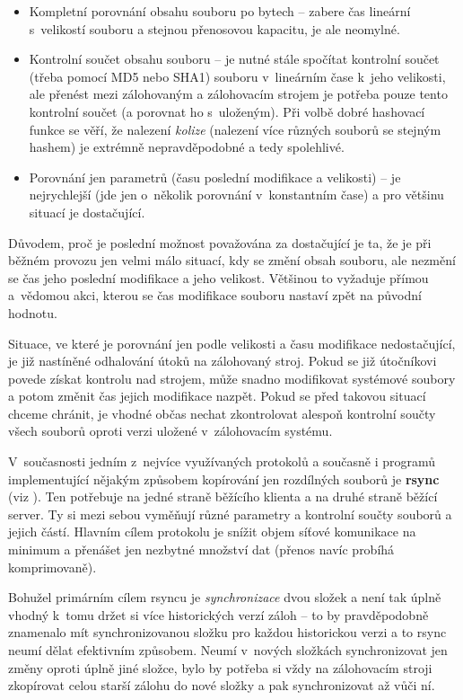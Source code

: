 \begin{itemize}
	\item Kompletní porovnání obsahu souboru po bytech -- zabere čas lineární
	s~velikostí souboru a stejnou přenosovou kapacitu, je ale neomylné.
	\item Kontrolní součet obsahu souboru -- je nutné stále spočítat kontrolní
	součet (třeba pomocí \gls{MD5} nebo \gls{SHA1}) souboru v~lineárním čase
	k~jeho velikosti, ale přenést mezi zálohovaným a zálohovacím strojem je
	potřeba pouze tento kontrolní součet (a porovnat ho s~uloženým). Při volbě
	dobré hashovací funkce se věří, že nalezení {\it kolize} (nalezení více
	různých souborů se stejným hashem) je extrémně nepravděpodobné a tedy
	spolehlivé.
	\item Porovnání jen parametrů (času poslední modifikace a velikosti) --
	je nejrychlejší (jde jen o~několik porovnání v~konstantním čase) a pro
	většinu situací je dostačující.
\end{itemize}

Důvodem, proč je poslední možnost považována za dostačující je ta, že je při
běžném provozu jen velmi málo situací, kdy se změní obsah souboru, ale nezmění
se čas jeho poslední modifikace a jeho velikost. Většinou to vyžaduje přímou
a~vědomou akci, kterou se čas modifikace souboru nastaví zpět na původní
hodnotu.

Situace, ve které je porovnání jen podle velikosti a času modifikace
nedostačující, je již nastíněné odhalování útoků na zálohovaný stroj. Pokud se
již útočníkovi povede získat kontrolu nad strojem, může snadno modifikovat
systémové soubory a potom změnit čas jejich modifikace nazpět. Pokud se před
takovou situací chceme chránit, je vhodné občas nechat zkontrolovat alespoň
kontrolní součty všech souborů oproti verzi uložené v~zálohovacím systému.

V~současnosti jedním z~nejvíce využívaných protokolů a současně i programů
implementující nějakým způsobem kopírování jen rozdílných souborů je {\bf rsync}
(viz \cite{rsync}). Ten potřebuje na jedné straně běžícího klienta a na druhé
straně běžící server. Ty si mezi sebou vyměňují různé parametry a kontrolní
součty souborů a jejich částí. Hlavním cílem protokolu je snížit objem síťové
komunikace na minimum a přenášet jen nezbytné množství dat (přenos navíc probíhá
komprimovaně).

Bohužel primárním cílem rsyncu je {\it synchronizace} dvou složek a není tak
úplně vhodný k~tomu držet si více historických verzí záloh -- to by pravděpodobně
znamenalo mít synchronizovanou složku pro každou historickou verzi a to rsync
neumí dělat efektivním způsobem. Neumí v~nových složkách synchronizovat jen
změny oproti úplně jiné složce, bylo by potřeba si vždy na zálohovacím stroji
zkopírovat celou starší zálohu do nové složky a pak synchronizovat až vůči ní.

